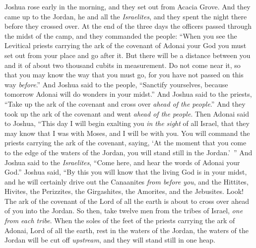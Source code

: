 \begin{biblechapter} %
 Joshua rose early in the morning, and they set out from Acacia Grove. And they came up to the Jordan, he and all the \textit{Israelites}, and they spent the night there before they crossed over.
\verse At the end of the three days the officers passed through the midst of the camp,
\verse and they commanded the people: “When you see the Levitical priests carrying the ark of the covenant of Adonai your God you must set out from your place and go after it.
\verse But there will be a distance between you and it of about two thousand cubits in measurement. Do not come near it, so that you may know the way that you must go, for you have not passed on this way \textit{before}.”
\verse And Joshua said to the people, “Sanctify yourselves, because tomorrow Adonai will do wonders in your midst.”
\verse And Joshua said to the priests, “Take up the ark of the covenant and cross over \textit{ahead of the people}.” And they took up the ark of the covenant and went \textit{ahead of the people}.
\verse Then Adonai said to Joshua, “This day I will begin exalting you \textit{in the sight} of all Israel, that they may know that I was with Moses, and I will be with you.
\verse You will command the priests carrying the ark of the covenant, saying, ‘At the moment that you come to the edge of the waters of the Jordan, you will stand still in the Jordan.’ ”
\verse And Joshua said to the \textit{Israelites}, “Come here, and hear the words of Adonai your God.”
\verse Joshua said, “By this you will know that the living God is in your midst, and he will certainly drive out the Canaanites \textit{from before you}, and the Hittites, Hivites, the Perizzites, the Girgashites, the Amorites, and the Jebusites.
\verse Look! The ark of the covenant of the Lord of all the earth is about to cross over ahead of you into the Jordan.
\verse So then, take twelve men from the tribes of Israel, \textit{one from each tribe}.
\verse When the soles of the feet of the priests carrying the ark of Adonai, Lord of all the earth, rest in the waters of the Jordan, the waters of the Jordan will be cut off \textit{upstream}, and they will stand still in one heap.

\end{biblechapter}
